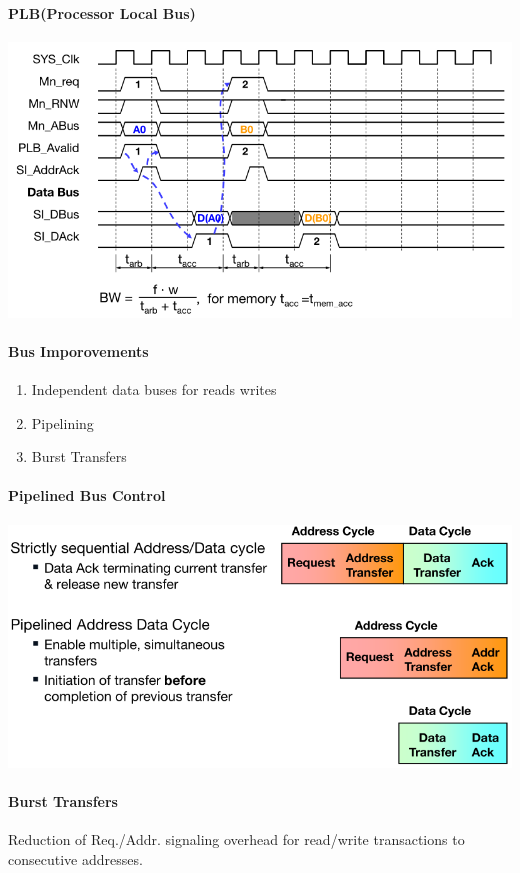 \documentclass[english]{latex4ei/latex4ei_sheet}
\begin{document}
\paragraph{PLB(Processor Local Bus)}

\begin{center}
	\includegraphics[width=0.75\linewidth]{images//6.Interconnects/PLBTiming.png}
\end{center}

\paragraph{Bus Imporovements}
\begin{enumerate}
	\item Independent data buses for reads writes
	\item Pipelining
	\item Burst Transfers
\end{enumerate}

\paragraph{Pipelined Bus Control}
\begin{center}
	\centering
	\includegraphics[width=0.75\linewidth]{images//6.Interconnects/PipelinedBusControl.png}
\end{center}

\paragraph{Burst Transfers} Reduction of Req./Addr. signaling overhead for read/write transactions to consecutive addresses.
\end{document}
